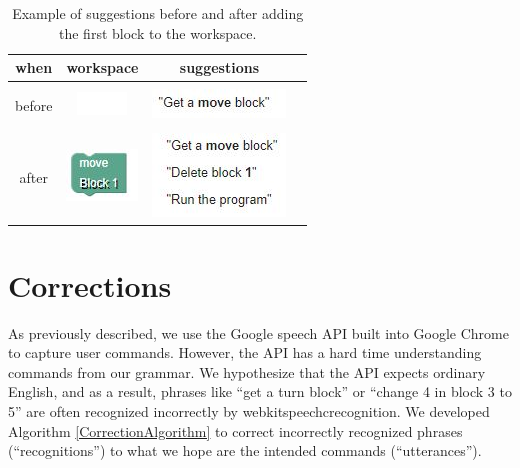 \documentclass[]{article}
\begin{document}
\begin{table}
	\caption{Example of suggestions before and after adding the first block to the workspace.}
	\label{SuggestionsBeforeAndAfter}
	\begin{tabular}{cccc}
		\hline
		when & workspace & suggestions \\\hline
		\\
		before & \includegraphics{suggestions_before_workspace.jpg} & \includegraphics{suggestions_before.jpg} \\\hline
		\\
		after & \includegraphics{suggestions_after_workspace.jpg} & \includegraphics{suggestions_after.jpg} \\\hline
	\end{tabular}
\end{table}

\section{Corrections}

As previously described, we use the Google speech API built into Google Chrome 
to capture user commands. However, the API has a hard time understanding 
commands from our grammar. We hypothesize that the API expects ordinary 
English, and as a result, phrases like ``get a turn block'' or ``change 4 in 
block 3 to 5'' are often recognized incorrectly by webkitspeechcrecognition. We 
developed Algorithm \ref{CorrectionAlgorithm} to correct incorrectly recognized 
phrases (``recognitions'') to what we hope are the intended commands 
(``utterances''). 
\end{document}
